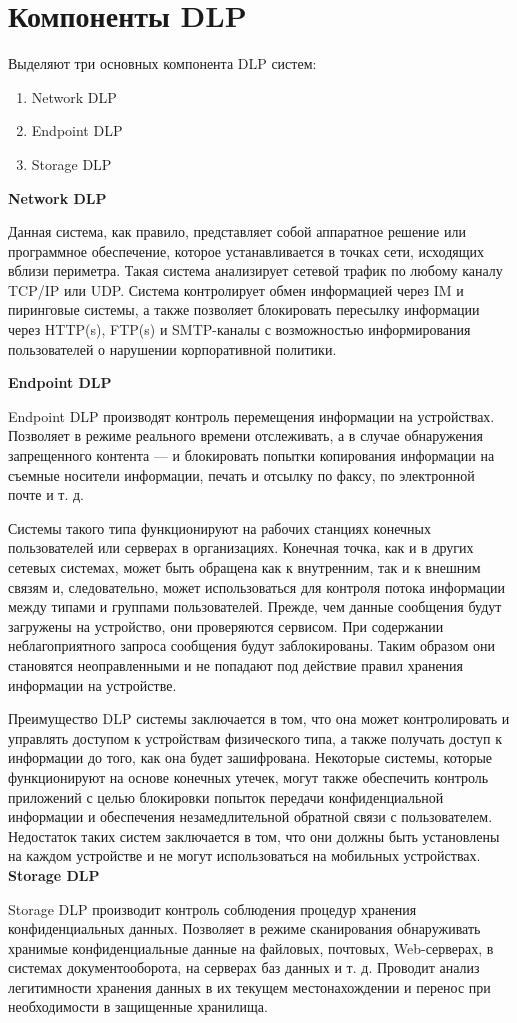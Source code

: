 \section{Компоненты DLP}

Выделяют три основных компонента DLP систем:

\begin{enumerate}
	\item
	    Network DLP
	\item 
	    Endpoint DLP
	\item 
	    Storage DLP
	    
\end{enumerate}

\textbf{Network DLP}

Данная система, как правило, представляет собой аппаратное решение или программное обеспечение, которое устанавливается в точках сети, исходящих вблизи периметра. Такая система анализирует сетевой трафик по любому каналу TCP/IP или UDP. Система контролирует обмен информацией через IM и пиринговые системы, а также позволяет блокировать пересылку информации через HTTP(s), FTP(s) и SMTP-каналы с возможностью информирования пользователей о нарушении корпоративной политики.

\textbf{Endpoint DLP}

Endpoint DLP производят контроль перемещения информации на устройствах. Позволяет в режиме реального времени отслеживать, а в случае обнаружения запрещенного контента — и блокировать попытки копирования информации на съемные носители информации, печать и отсылку по факсу, по электронной почте и т. д.

Системы такого типа функционируют на рабочих станциях конечных пользователей или серверах в организациях. Конечная точка, как и в других сетевых системах, может быть обращена как к внутренним, так и к внешним связям и, следовательно, может использоваться для контроля потока информации между типами и группами пользователей. Прежде, чем данные сообщения будут загружены на устройство, они проверяются сервисом. При содержании неблагоприятного запроса сообщения будут заблокированы. Таким образом они становятся неоправленными и не попадают под действие правил хранения информации на устройстве.

Преимущество DLP системы заключается в том, что она может контролировать и управлять доступом к устройствам физического типа, а также получать доступ к информации до того, как она будет зашифрована. Некоторые системы, которые функционируют на основе конечных утечек, могут также обеспечить контроль приложений с целью блокировки попыток передачи конфиденциальной информации и обеспечения незамедлительной обратной связи с пользователем. Недостаток таких систем заключается в том, что они должны быть установлены на каждом устройстве и не могут использоваться на мобильных устройствах. 
\textbf{Storage DLP}

Storage DLP производит контроль соблюдения процедур хранения конфиденциальных данных. Позволяет в режиме сканирования обнаруживать хранимые конфиденциальные данные на файловых, почтовых, Web-серверах, в системах документооборота, на серверах баз данных и т. д. Проводит анализ легитимности хранения данных в их текущем местонахождении и перенос при необходимости в защищенные хранилища.
